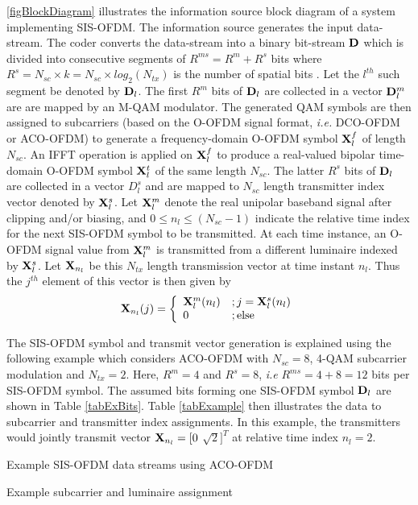 \documentclass[12pt,letterpaper,onecolumn]{article} %
\newcommand{\vm}[1]{{\bf{#1}}}
\newcommand{\twopartdef}[4]
{
	\left\{
		\begin{array}{ll}
			#1 &; #2 \\
			#3 &; #4
		\end{array}
	\right.
}
\begin{document}
\figurename{\ref{figBlockDiagram}} illustrates the information source block diagram of a system implementing SIS-OFDM. The information source generates the input data-stream. The coder converts the data-stream into a binary bit-stream $\vm{D}$ which is divided into consecutive segments of $R^{ms}=R^{m}+R^{s}$ bits where $R^{s}=N_{sc}\times k=N_{sc}\times log_2(N_{tx})$ is the number of spatial bits . Let the $l^{th}$ such segment be denoted by $\vm{D}_l$. The first $R^{m}$ bits of $\vm{D}_l$ are collected in a vector $\vm{D}_l^m$ are are mapped by an M-QAM modulator. The generated QAM symbols are then assigned to subcarriers (based on the O-OFDM signal format, \textit{i.e.} DCO-OFDM or ACO-OFDM) to generate a frequency-domain O-OFDM symbol $\vm{X}_l^f$ of length $N_{sc}$. An IFFT operation is applied on $\vm{X}_l^f$ to produce a real-valued bipolar time-domain O-OFDM symbol $\vm{X}_l^t$ of the same length $N_{sc}$. The latter $R^{s}$ bits of $\vm{D}_l$ are collected in a vector $D_l^s$ and are mapped to $N_{sc}$ length transmitter index vector denoted by $\vm{X}_l^s$. Let $\vm{X}_l^m$ denote the real unipolar baseband signal after clipping and/or biasing, and $0\leq n_l\leq (N_{sc}-1)$ indicate the relative time index for the next SIS-OFDM symbol to be transmitted. At each time instance, an O-OFDM signal value from $\vm{X}_l^m$ is transmitted from a different luminaire indexed by $\vm{X}_l^s$. Let $\vm{X}_{n_l}$ be this $N_{tx}$ length transmission vector at time instant $n_l$. Thus the $j^{th}$ element of this vector is then given by
\begin{equation}
	\label{eqX}
	\vm{X}_{n_l}(j) = \twopartdef{\vm{X}_l^m(n_l)}{j=\vm{X}_l^s(n_l)}{0}{\text{else}}
\end{equation}

The SIS-OFDM symbol and transmit vector generation is explained using the following example which considers ACO-OFDM with $N_{sc}=8$, 4-QAM subcarrier modulation and $N_{tx}=2$. Here, $R^{m}=4$ and $R^{s}=8$, \textit{i.e} $R^{ms}=4+8=12$ bits per SIS-OFDM symbol. The assumed bits forming one SIS-OFDM symbol $\vm{D}_l$ are shown in Table \ref{tabExBits}. Table \ref{tabExample} then illustrates the data to subcarrier and transmitter index assignments. In this example, the transmitters would jointly transmit vector $\vm{X}_{n_l}=[0$ $\sqrt{2}]^T$ at relative time index $n_l=2$.
\begin{table}[b]
\makebox[\textwidth]{\framebox[3in]{\rule{0pt}{1in}}}
\caption{Example SIS-OFDM data streams using ACO-OFDM}
\quad
\makebox[\textwidth]{\framebox[5in]{\rule{0pt}{2in}}}
\caption{Example subcarrier and luminaire assignment}
\end {table}
\end{document}
